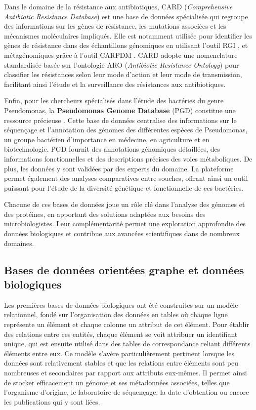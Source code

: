 Dans le domaine de la résistance aux antibiotiques, CARD (\textit{Comprehensive Antibiotic Resistance Database}) \cite{mcarthur_comprehensive_2013} est une base de données spécialisée qui regroupe des informations sur les gènes de résistance, les mutations associées et les mécanismes moléculaires impliqués. Elle est notamment utilisée pour identifier les gènes de résistance dans des échantillons génomiques en utilisant l'outil RGI \cite{alcock_card_2023}, et métagénomiques grâce à l’outil CARPDM \cite{hackenberger_carpdm_2024}. CARD adopte une nomenclature standardisée basée sur l’ontologie ARO (\textit{Antibiotic Resistance Ontology}) pour classifier les résistances selon leur mode d’action et leur mode de transmission, facilitant ainsi l’étude et la surveillance des résistances aux antibiotiques.

Enfin, pour les chercheurs spécialisés dans l'étude des bactéries du genre Pseudomonas, la \textbf{Pseudomonas Genome Database} (PGD) constitue une ressource précieuse \cite{winsor_enhanced_2016}. Cette base de données centralise des informations sur le séquençage et l’annotation des génomes des différentes espèces de Pseudomonas, un groupe bactérien d’importance en médecine, en agriculture et en biotechnologie. PGD fournit des annotations génomiques détaillées, des informations fonctionnelles et des descriptions précises des voies métaboliques. De plus, les données y sont validées par des experts du domaine. La plateforme permet également des analyses comparatives entre souches, offrant ainsi un outil puissant pour l’étude de la diversité génétique et fonctionnelle de ces bactéries.

Chacune de ces bases de données joue un rôle clé dans l’analyse des génomes et des protéines, en apportant des solutions adaptées aux besoins des microbiologistes. Leur complémentarité permet une exploration approfondie des données biologiques et contribue aux avancées scientifiques dans de nombreux domaines.

\subsection{Bases de données orientées graphe et données biologiques}

Les premières bases de données biologiques ont été construites sur un modèle relationnel, fondé sur l’organisation des données en tables où chaque ligne représente un élément et chaque colonne un attribut de cet élément. Pour établir des relations entre ces entités, chaque élément se voit attribuer un identifiant unique, qui est ensuite utilisé dans des tables de correspondance reliant différents éléments entre eux. Ce modèle s’avère particulièrement pertinent lorsque les données sont relativement stables et que les relations entre éléments sont peu nombreuses et secondaires par rapport aux attributs eux-mêmes. Il permet ainsi de stocker efficacement un génome et ses métadonnées associées, telles que l’organisme d’origine, le laboratoire de séquençage, la date d’obtention ou encore les publications qui y sont liées.


